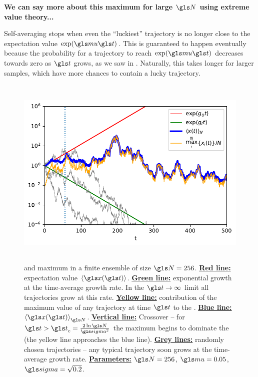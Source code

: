 \textbf{We can say more about this maximum for large $\N$ using extreme value theory...}

Self-averaging stops when even the ``luckiest'' trajectory is no longer close to the expectation value $\exp(\gmu \t)$. This is guaranteed to happen eventually because the probability for a trajectory to reach $\exp(\gmu \t)$ decreases towards zero as $\t$ grows, as we saw in . Naturally, this takes longer for larger samples, which have more chances to contain a lucky trajectory. 

\begin{figure}
\centering
\includegraphics[height=9.3cm]{./chapter_people/figs/trajectories.pdf}
\caption{\PEA and maximum in a finite ensemble of size $\N=256$. {\bf \underline{Red line:}} expectation value $\ave{\x(\t)}$. 
{\bf \underline{Green line:}} exponential growth at the time-average growth rate. In the $\t\to\infty$ limit all trajectories grow at this rate. 
{\bf \underline{Yellow line:}} contribution of the maximum value of any trajectory at time $\t$ to the \PEA.  
{\bf \underline{Blue line:}} \PEA $\ave{\x(\t)}_\N$.
{\bf \underline{Vertical line:}} Crossover -- for $\t>\t_c=\frac{2\ln \N}{\gsigma^2}$ the maximum begins to dominate the \PEA (the yellow line approaches the blue line).
{\bf \underline{Grey lines:}} randomly chosen trajectories -- any typical trajectory soon grows at the time-average growth rate.  
{\bf \underline{Parameters:}} $\N=256$, $\gmu=0.05$, $\gsigma=\sqrt{0.2}$.}
\end{figure}
\FloatBarrier

